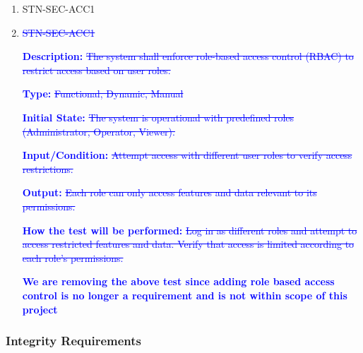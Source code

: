 \documentclass[12pt, titlepage]{article}
\begin{document}
\begin{enumerate}

\item{STN-SEC-ACC1\\}

\item \textcolor{blue}{\sout{STN-SEC-ACC1\\}}

\textbf{\textcolor{blue}{Description:}} \textcolor{blue}{\sout{The system shall enforce role-based access control (RBAC) to restrict access based on user roles.}}

\textbf{\textcolor{blue}{Type:}} \textcolor{blue}{\sout{Functional, Dynamic, Manual}}

\textbf{\textcolor{blue}{Initial State:}} \textcolor{blue}{\sout{The system is operational with predefined roles (Administrator, Operator, Viewer).}}

\textbf{\textcolor{blue}{Input/Condition:}} \textcolor{blue}{\sout{Attempt access with different user roles to verify access restrictions.}}

\textbf{\textcolor{blue}{Output:}} \textcolor{blue}{\sout{Each role can only access features and data relevant to its permissions.}}

\textbf{\textcolor{blue}{How the test will be performed:}} \textcolor{blue}{\sout{Log in as different roles and attempt to access restricted features and data. Verify that access is limited according to each role’s permissions.}}

\textbf{\textcolor{blue}{We are removing the above test since adding role based access control is no longer a requirement and is not within scope of this project}}

\end{enumerate}

\subsubsection{Integrity Requirements}
\end{document}

